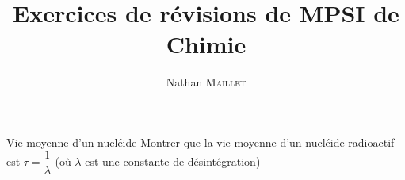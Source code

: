 \documentclass[french, a4paper, 11pt]{article}
\title{Exercices de révisions de MPSI de Chimie}
\author{Nathan \textsc{Maillet}}
\date{}
\newcommand{\inv}[1]{\dfrac{1}{#1}}
\begin{document}
\maketitle

\begin{cadre}{Vie moyenne d'un nucléide}
  Montrer que la vie moyenne d'un nucléide radioactif est \(\tau=\inv{\lambda}\) (où \(\lambda\) est une constante de désintégration)
\end{cadre}
\end{document}
